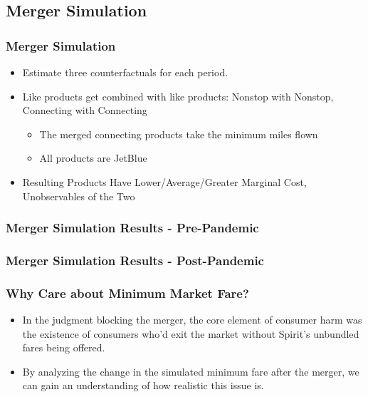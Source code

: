 \documentclass[xcolor=dvipsnames]{beamer}
\let\Oldsubsection\subsection
\renewcommand{\subsection}{\FloatBarrier\Oldsubsection}
\begin{document}
    \subsection{Merger Simulation}
   	\begin{frame}
		\frametitle{Merger Simulation}
			\begin{itemize}
            \item Estimate three counterfactuals for each period.
                \item Like products get combined with like products: Nonstop with Nonstop, Connecting with Connecting
                    \begin{itemize}
                        \item The merged connecting products take the minimum miles flown 
                        \item All products are JetBlue
                    \end{itemize}
				\item Resulting Products Have Lower/Average/Greater Marginal Cost, Unobservables of the Two
        \end{itemize}
	\end{frame}

    \begin{frame}
        \frametitle{Merger Simulation Results - Pre-Pandemic}
        \tiny
        \centering
        \begin{adjustbox}{max height=\dimexpr\textheight-5.5cm\relax,
           max width=\textwidth}

\end{adjustbox}
    \end{frame}

    \begin{frame}
        \frametitle{Merger Simulation Results - Post-Pandemic}
        \tiny
        \centering
        \begin{adjustbox}{max height=\dimexpr\textheight-5.5cm\relax,
           max width=\textwidth}

\end{adjustbox}

    \end{frame}
    
    \begin{frame}
        \frametitle{Why Care about Minimum Market Fare?}
        \begin{itemize}
            \item In the judgment blocking the merger, the core element of consumer harm was the existence of consumers who'd exit the market without Spirit's unbundled fares being offered.
            \item By analyzing the change in the simulated minimum fare after the merger, we can gain an understanding of how realistic this issue is.
        \end{itemize}
    \end{frame}
\end{document}

